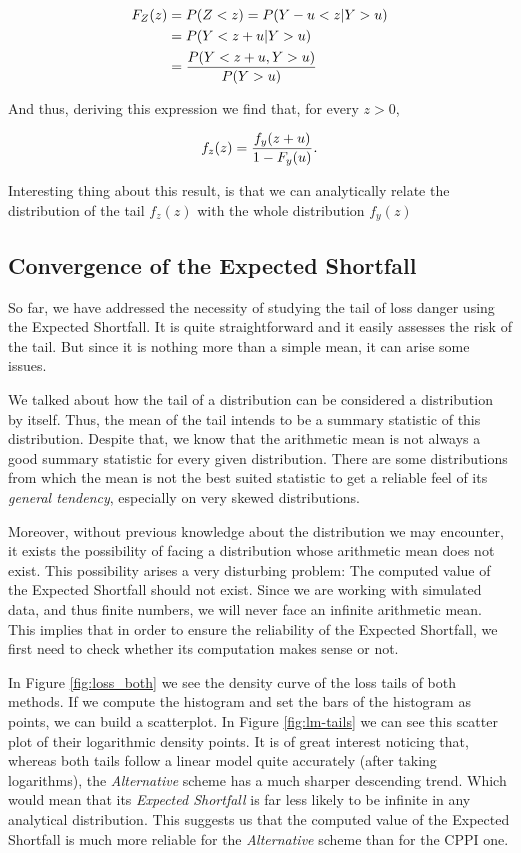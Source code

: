 \begin{align}
    F_Z(z)  &=  P(Z < z) = P\qty(Y-u < z | Y>u)  \\
            &=  P\qty(Y<z+u | Y>u) \\
            &= \frac{P\qty(Y<z+u, Y>u)}{P\qty(Y>u)}
\end{align}

And thus, deriving this expression we find that, for every $z>0$,

\begin{align}
    f_z(z) = \frac{f_y\qty(z+u)}{1-F_y(u)}\textit{.}
\end{align}

Interesting thing about this result, is that we can analytically relate the distribution of the tail $f_z(z)$ with the whole distribution $f_y(z)$

\subsection{Convergence of the Expected Shortfall}

So far, we have addressed the necessity of studying the tail of loss danger using the Expected Shortfall. It is quite straightforward and it easily assesses the risk of the tail. But since it is nothing more than a simple mean, it can arise some issues. 

We talked about how the tail of a distribution can be considered a distribution by itself. Thus, the mean of the tail intends to be a summary statistic of this distribution. Despite that, we know that the arithmetic mean is not always a good summary statistic for every given distribution. There are some distributions from which the mean is not the best suited statistic to get a reliable feel of its \emph{general tendency}, especially on very skewed distributions.

Moreover, without previous knowledge about the distribution we may encounter, it exists the possibility of facing a distribution whose arithmetic mean does not exist. This possibility arises a very disturbing problem: The computed value of the Expected Shortfall should not exist. Since we are working with simulated data, and thus finite numbers, we will never face an infinite arithmetic mean. This implies that in order to ensure the reliability of the Expected Shortfall, we first need to check whether its computation makes sense or not.

In Figure \ref{fig:loss_both} we see the density curve of the loss tails of both methods. If we compute the histogram and set the bars of the histogram as points, we can build a scatterplot. 
In Figure \ref{fig:lm-tails} we can see this scatter plot of their logarithmic density points. It is of great interest noticing that, whereas both tails follow a linear model quite accurately (after taking logarithms), the \textit{Alternative} scheme has a much sharper descending trend. Which would mean that its \textit{Expected Shortfall} is far less likely to be infinite in any analytical distribution. This suggests us that the computed value of the Expected Shortfall is much more reliable for the \textit{Alternative} scheme than for the CPPI one.

